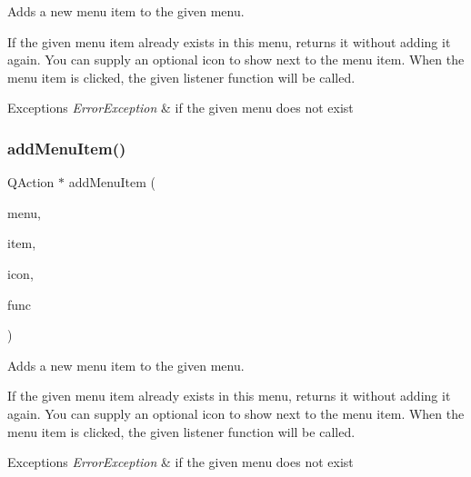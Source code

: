 Adds a new menu item to the given menu. 

If the given menu item already exists in this menu, returns it without adding it again. You can supply an optional icon to show next to the menu item. When the menu item is clicked, the given listener function will be called. 
\begin{DoxyExceptions}{Exceptions}
{\em Error\+Exception} & if the given menu does not exist \\
\hline
\end{DoxyExceptions}
\mbox{\label{classsgl_1_1GWindow_a9c1d62659ac23b6752a59dc657c5140c}} 
\subsubsection{\texorpdfstring{add\+Menu\+Item()}{addMenuItem()}\hspace{0.1cm}{\footnotesize\ttfamily [3/4]}}
{\footnotesize\ttfamily Q\+Action $\ast$ add\+Menu\+Item (\begin{DoxyParamCaption}\item[{const std\+::string \&}]{menu,  }\item[{const std\+::string \&}]{item,  }\item[{const Q\+Icon \&}]{icon,  }\item[{\mbox{\hyperlink{namespacesgl_a54427ce97bb1c2804e4fe2b0a62e8b17}{G\+Event\+Listener\+Void}}}]{func }\end{DoxyParamCaption})\hspace{0.3cm}{\ttfamily [virtual]}}



Adds a new menu item to the given menu. 

If the given menu item already exists in this menu, returns it without adding it again. You can supply an optional icon to show next to the menu item. When the menu item is clicked, the given listener function will be called. 
\begin{DoxyExceptions}{Exceptions}
{\em Error\+Exception} & if the given menu does not exist \\
\hline
\end{DoxyExceptions}
\mbox{\label{classsgl_1_1GWindow_a8452af11e9c36ac44dbdc4332095871e}} 
